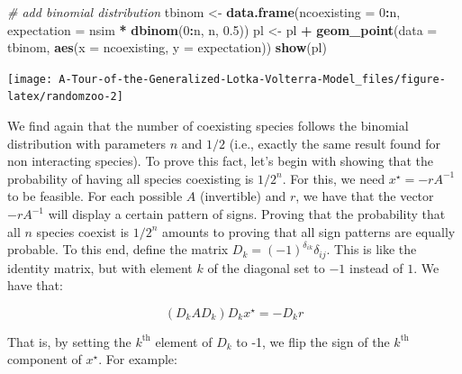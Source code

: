 \documentclass[
]{book}
\newenvironment{Shaded}{\begin{snugshade}}{\end{snugshade}}
\newcommand{\CommentTok}[1]{\textcolor[rgb]{0.56,0.35,0.01}{\textit{#1}}}
\newcommand{\DataTypeTok}[1]{\textcolor[rgb]{0.13,0.29,0.53}{#1}}
\newcommand{\DecValTok}[1]{\textcolor[rgb]{0.00,0.00,0.81}{#1}}
\newcommand{\FloatTok}[1]{\textcolor[rgb]{0.00,0.00,0.81}{#1}}
\newcommand{\KeywordTok}[1]{\textcolor[rgb]{0.13,0.29,0.53}{\textbf{#1}}}
\newcommand{\NormalTok}[1]{#1}
\newcommand{\OperatorTok}[1]{\textcolor[rgb]{0.81,0.36,0.00}{\textbf{#1}}}
\newcommand{\StringTok}[1]{\textcolor[rgb]{0.31,0.60,0.02}{#1}}
\begin{document}
\begin{Shaded}
\begin{Highlighting}[]
\CommentTok{# add binomial distribution}
\NormalTok{tbinom <-}\StringTok{ }\KeywordTok{data.frame}\NormalTok{(}\DataTypeTok{ncoexisting =} \DecValTok{0}\OperatorTok{:}\NormalTok{n, }
                 \DataTypeTok{expectation =}\NormalTok{ nsim }\OperatorTok{*}\StringTok{ }\KeywordTok{dbinom}\NormalTok{(}\DecValTok{0}\OperatorTok{:}\NormalTok{n, n, }\FloatTok{0.5}\NormalTok{))}
\NormalTok{pl <-}\StringTok{ }\NormalTok{pl }\OperatorTok{+}\StringTok{ }\KeywordTok{geom_point}\NormalTok{(}\DataTypeTok{data =}\NormalTok{ tbinom, }\KeywordTok{aes}\NormalTok{(}\DataTypeTok{x =}\NormalTok{ ncoexisting, }\DataTypeTok{y =}\NormalTok{ expectation))}
\KeywordTok{show}\NormalTok{(pl)}
\end{Highlighting}
\end{Shaded}

\begin{center}\texttt{[image: A-Tour-of-the-Generalized-Lotka-Volterra-Model\_files/figure-latex/randomzoo-2]} \end{center}

We find again that the number of coexisting species follows the binomial distribution with parameters \(n\) and \(1/2\) (i.e., exactly the same result found for non interacting species). To prove this fact, let's begin with showing that the probability of having all species coexisting is \(1 / 2^n\). For this, we need \(x^\star = -r A^{-1}\) to be feasible. For each possible \(A\) (invertible) and \(r\), we have that the vector \(-r A^{-1}\) will display a certain pattern of signs. Proving that the probability that all \(n\) species coexist is \(1 / 2^n\) amounts to proving that all sign patterns are equally probable. To this end, define the matrix \(D_k = (-1)^{\delta_{ik}} \delta_{ij}\). This is like the identity matrix, but with element \(k\) of the diagonal set to \(-1\) instead of \(1\). We have that:

\[
(D_k A D_k) D_k x^\star = -D_k r
\]

That is, by setting the \(k^\text{th}\) element of \(D_k\) to -1, we flip the sign of the \(k^\text{th}\) component of \(x^\star\). For example:
\end{document}

